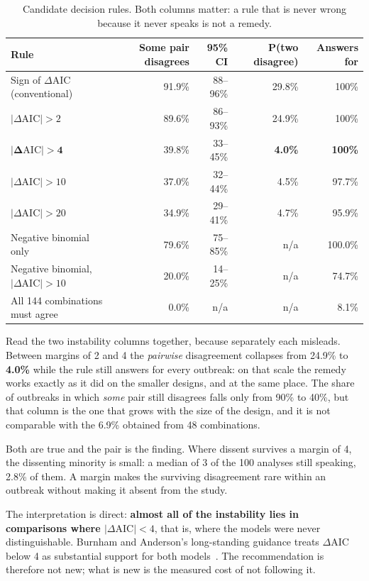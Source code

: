 \documentclass[11pt,a4paper]{article}
\begin{document}
\begin{table}[htbp]
\centering
\caption{Candidate decision rules. Both columns matter: a rule that is never
wrong because it never speaks is not a remedy.}
\begin{tabular}{lrrrr}
\toprule
Rule & Some pair disagrees & 95\% CI & P(two disagree) & Answers for \\
\midrule
Sign of $\Delta$AIC (conventional) & 91.9\% & 88--96\% & 29.8\% & 100\% \\
$|\Delta\mathrm{AIC}| > 2$ & 89.6\% & 86--93\% & 24.9\% & 100\% \\
$\boldsymbol{|\Delta\mathrm{AIC}| > 4}$ & 39.8\% & 33--45\% & \textbf{4.0\%} & \textbf{100\%} \\
$|\Delta\mathrm{AIC}| > 10$ & 37.0\% & 32--44\% & 4.5\% & 97.7\% \\
$|\Delta\mathrm{AIC}| > 20$ & 34.9\% & 29--41\% & 4.7\% & 95.9\% \\
Negative binomial only & 79.6\% & 75--85\% & n/a & 100.0\% \\
Negative binomial, $|\Delta\mathrm{AIC}| > 10$ & 20.0\% & 14--25\% & n/a & 74.7\% \\
All 144 combinations must agree & 0.0\% & n/a & n/a & 8.1\% \\
\bottomrule
\end{tabular}
\end{table}

Read the two instability columns together, because separately each misleads.
Between margins of 2 and 4 the \emph{pairwise} disagreement collapses from 24.9\%
to \textbf{4.0\%} while the rule still answers for every outbreak: on that scale
the remedy works exactly as it did on the smaller designs, and at the same place.
The share of outbreaks in which \emph{some} pair still disagrees falls only from
90\% to 40\%, but that column is the one that grows with the size of the design,
and it is not comparable with the 6.9\% obtained from 48 combinations.

Both are true and the pair is the finding. Where dissent survives a margin of 4,
the dissenting minority is small: a median of 3 of the 100 analyses still
speaking, 2.8\% of them. A margin makes the surviving disagreement rare within an
outbreak without making it absent from the study.

The interpretation is direct: \textbf{almost all of the instability lies in
comparisons where $|\Delta\mathrm{AIC}| < 4$}, that is, where the models were
never distinguishable. Burnham and Anderson's long-standing guidance treats
$\Delta$AIC below 4 as substantial support for both models~\cite{burnham}. The
recommendation is therefore not new; what is new is the measured cost of not
following it.
\end{document}
